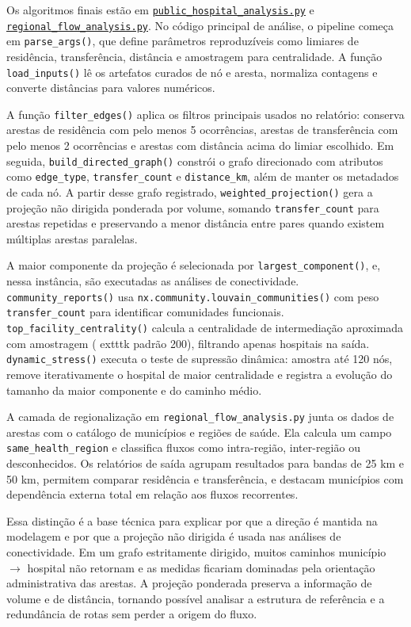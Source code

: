 \documentclass[10pt,a4paper]{article}
\newcommand{\repo}{https://github.com/lcardosott/sus-graph-project}
\newcommand{\repobranch}{gh-pages}
\newcommand{\ghfile}[2]{\href{\repo/blob/\repobranch/#1}{\texttt{#2}}}
\begin{document}
Os algoritmos finais estão em \ghfile{algorithm_layer/public_hospital_analysis.py}{public\_hospital\_analysis.py} e \ghfile{algorithm_layer/regional_flow_analysis.py}{regional\_flow\_analysis.py}. No código principal de análise, o pipeline começa em \texttt{parse\_args()}, que define parâmetros reproduzíveis como limiares de residência, transferência, distância e amostragem para centralidade. A função \texttt{load\_inputs()} lê os artefatos curados de nó e aresta, normaliza contagens e converte distâncias para valores numéricos.

A função \texttt{filter\_edges()} aplica os filtros principais usados no relatório: conserva arestas de residência com pelo menos 5 ocorrências, arestas de transferência com pelo menos 2 ocorrências e arestas com distância acima do limiar escolhido. Em seguida, \texttt{build\_directed\_graph()} constrói o grafo direcionado com atributos como \texttt{edge\_type}, \texttt{transfer\_count} e \texttt{distance\_km}, além de manter os metadados de cada nó. A partir desse grafo registra\-do, \texttt{weighted\_projection()} gera a projeção não dirigida ponderada por volume, somando \texttt{transfer\_count} para arestas repetidas e preservando a menor distância entre pares quando existem múltiplas arestas paralelas.

A maior componente da projeção é selecionada por \texttt{largest\_component()}, e, nessa instância, são executadas as análises de conectividade. \texttt{community\_reports()} usa \texttt{nx.community.louvain\_communities()} com peso \texttt{transfer\_count} para identificar comunidades funcionais. \texttt{top\_facility\_centrality()} calcula a centralidade de intermediação aproximada com amostragem (	exttt{k} padrão 200), filtrando apenas hospitais na saída. \texttt{dynamic\_stress()} executa o teste de supressão dinâmica: amostra até 120 nós, remove iterativamente o hospital de maior centralidade e registra a evolução do tamanho da maior componente e do caminho médio.

A camada de regionalização em \texttt{regional\_flow\_analysis.py} junta os dados de arestas com o catálogo de municípios e regiões de saúde. Ela calcula um campo \texttt{same\_health\_region} e classifica fluxos como intra-região, inter-região ou desconhecidos. Os relatórios de saída agrupam resultados para bandas de 25 km e 50 km, permitem comparar residência e transferência, e destacam municípios com dependência externa total em relação aos fluxos recorrentes.

Essa distinção é a base técnica para explicar por que a direção é mantida na modelagem e por que a projeção não dirigida é usada nas análises de conectividade. Em um grafo estritamente dirigido, muitos caminhos município $\rightarrow$ hospital não retornam e as medidas ficariam dominadas pela orientação administrativa das arestas. A projeção ponderada preserva a informação de volume e de distância, tornando possível analisar a estrutura de referência e a redundância de rotas sem perder a origem do fluxo.
\end{document}
